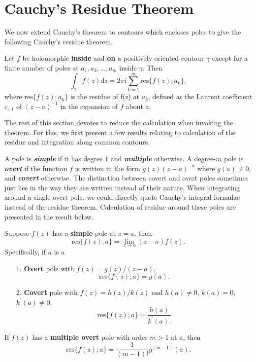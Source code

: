 \documentclass{article}
\begin{document}
\section{Cauchy's Residue Theorem}
We now extend Cauchy's theorem to contours which encloses poles to give the following Cauchy's residue theorem. 
\begin{frm-thm}
    Let $f$ be holomorphic \textbf{inside} and \textbf{on} a positively oriented contour $\gamma $ except for a finite number of poles at $a_1, a_2, \ldots , a_m $ inside $\gamma $. Then
    \[
        \int_\gamma f(z) \mathrm{d}z = 2 \pi i \sum\limits_{k=1}^{m} \mathrm{res}\{f(z);  a_k\},
    \]
    where $\mathrm{res}\{f(z); a_k\}$ is the residue of f(z) at $a_k$, defined as the Laurent coefficient $c_{-1}$ of $(z-a)^{-1} $ in the expansion of $f$ about $a$. 
\end{frm-thm}
The rest of this section devotes to reduce the calculation when invoking the theorem. For this, we first present a few results relating to calculation of the residue and integration along common contours. 

A pole is \textit{\textbf{simple}} if it has degree $1$ and \textit{\textbf{multiple}} otherwise. A degree-$m$ pole is \textit{\textbf{overt}} if the function $f$ is written in the form $g(z)(z-a)^{-a} $ where $g(a) \neq  0$, and \textit{\textbf{covert}} otherwise. The distinction between covert and overt poles sometimes just lies in the way they are written instead of their nature. When integrating around a single overt pole, we could directly quote Cauchy's integral formulae instead of the residue theorem. Calculation of residue around these poles are presented in the result below. 
\begin{frm-res}
    Suppose $f(z)$ has a \textbf{simple}  pole at $z=a$, then 
    \[
        \mathrm{res} \{f(z); a \} = \lim\limits_{z \to a} (z-a) f(z). 
    \]
    Specifically, if $a$ is a 
    \begin{itemize}
        \item[1.] \textbf{Overt} pole with $f(z)=g(z) / (z-a),$ \[\mathrm{res} \{f(z); a \} = g(a).\]
        \item[2.] \textbf{Covert} pole with $f(z) = h(z)/k(z)$ and $h(a) \neq 0$, $k(a)=0$, $k^\prime (a) \neq 0$, 
        \[
            \mathrm{res} \{f(z); a \} = \frac{h(a)}{k^\prime (a).}
        \]
    \end{itemize}
\end{frm-res}

\begin{frm-res}
    If $f(z)$ has a \textbf{multiple overt} pole with order $m>1$ at $a$, then 
    \[
        \mathrm{res} \{f(z); a \} = \frac{1}{(m-1)!}g^{(m-1)}(a).
    \]
\end{frm-res}
\end{document}
